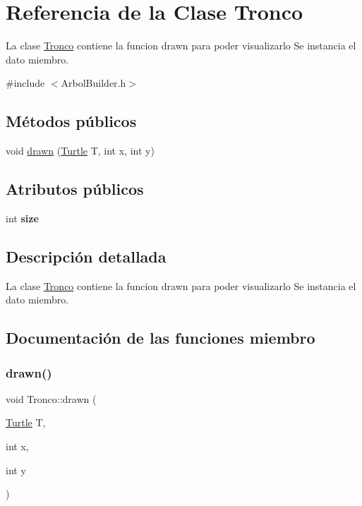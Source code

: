 \hypertarget{classTronco}{}\section{Referencia de la Clase Tronco}
\label{classTronco}


La clase \hyperlink{classTronco}{Tronco} contiene la funcion drawn para poder visualizarlo  Se instancia el dato miembro.  




{\ttfamily \#include $<$Arbol\+Builder.\+h$>$}

\subsection*{Métodos públicos}
\begin{DoxyCompactItemize}
\item 
void \hyperlink{classTronco_a0976269e055e451f0ca43059a46ea742}{drawn} (\hyperlink{classTurtle}{Turtle} T, int x, int y)
\end{DoxyCompactItemize}
\subsection*{Atributos públicos}
\begin{DoxyCompactItemize}
\item 
\mbox{\label{classTronco_a34fac18044bfd5f785e795b0a6037c21}} 
int {\bfseries size}
\end{DoxyCompactItemize}


\subsection{Descripción detallada}
La clase \hyperlink{classTronco}{Tronco} contiene la funcion drawn para poder visualizarlo  Se instancia el dato miembro. 

\subsection{Documentación de las funciones miembro}
\mbox{\label{classTronco_a0976269e055e451f0ca43059a46ea742}} 
\subsubsection{\texorpdfstring{drawn()}{drawn()}}
{\footnotesize\ttfamily void Tronco\+::drawn (\begin{DoxyParamCaption}\item[{\hyperlink{classTurtle}{Turtle}}]{T,  }\item[{int}]{x,  }\item[{int}]{y }\end{DoxyParamCaption})}

